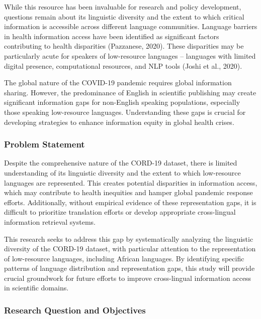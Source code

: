 \documentclass[
]{article}
\begin{document}
While this resource has been invaluable for research and policy
development, questions remain about its linguistic diversity and the
extent to which critical information is accessible across different
language communities. Language barriers in health information access
have been identified as significant factors contributing to health
disparities (Pazzanese, 2020). These disparities may be particularly
acute for speakers of low-resource languages -- languages with limited
digital presence, computational resources, and NLP tools (Joshi et al.,
2020).

The global nature of the COVID-19 pandemic requires global information
sharing. However, the predominance of English in scientific publishing
may create significant information gaps for non-English speaking
populations, especially those speaking low-resource languages.
Understanding these gaps is crucial for developing strategies to enhance
information equity in global health crises.

\subsubsection{Problem Statement}\label{problem-statement}

Despite the comprehensive nature of the CORD-19 dataset, there is
limited understanding of its linguistic diversity and the extent to
which low-resource languages are represented. This creates potential
disparities in information access, which may contribute to health
inequities and hamper global pandemic response efforts. Additionally,
without empirical evidence of these representation gaps, it is difficult
to prioritize translation efforts or develop appropriate cross-lingual
information retrieval systems.

This research seeks to address this gap by systematically analyzing the
linguistic diversity of the CORD-19 dataset, with particular attention
to the representation of low-resource languages, including African
languages. By identifying specific patterns of language distribution and
representation gaps, this study will provide crucial groundwork for
future efforts to improve cross-lingual information access in scientific
domains.

\subsubsection{Research Question and
Objectives}\label{research-question-and-objectives}
\end{document}
